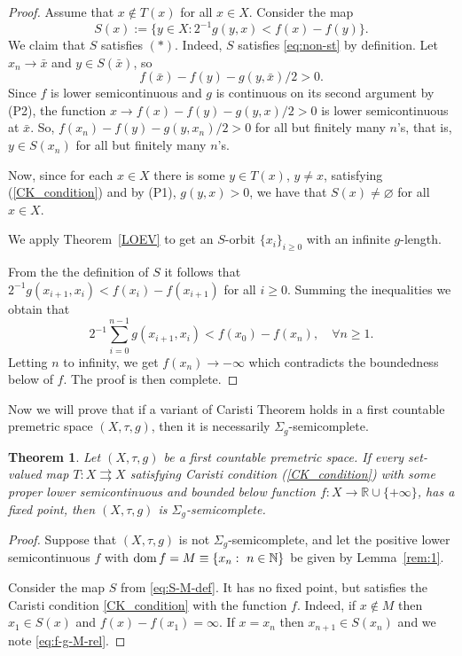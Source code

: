 \documentclass[12pt]{article}
\newtheorem{theorem}{Theorem}[section]
\def\dom{\mathop{\rm dom}}
\newcommand{\R}{\mathbb{R}}
\begin{document}
\begin{proof}
Assume that $x \notin T(x)$ for all $x \in X$. Consider the map
\[S(x):=\{y \in X: 2^{-1}g(y,x) < f(x)-f(y) \}.\]
We claim that $S$ satisfies $(\ast)$. Indeed, $S$ satisfies \eqref{eq:non-st} by definition. Let $x_n\to \bar x$ and $y\in S(\bar x)$, so
$$
   f(\bar x) - f(y) - g(y,\bar x)/2 > 0.
$$
Since $f$ is lower semicontinuous and $g$ is continuous on its second argument by (P2), the function $x\to f(x) - f(y) - g(y,x)/2 >0$ is lower semicontinuous at $\bar x$. So,  $f(x_n) - f(y) - g(y,x_n)/2 >0$ for all but finitely many $n$'s, that is, $y\in S(x_n)$ for all but finitely many $n$'s.

Now, since for each $x \in X$ there is some $y \in T(x)$, $y\neq x$, satisfying (\ref{CK_condition}) and by (P1), $g(y,x)>0$, we have that  $S(x) \neq \varnothing$ for all $x \in X$.

We apply  Theorem~\ref{LOEV} to get an $S$-orbit $\{x_i\}_{i\ge 0}$ with an
infinite $g$-length.

From the  the definition of $S$ it follows that  $2^{-1}g(x_{i+1},x_{i})<f(x_i)-f(x_{i+1})$ for all $i\ge 0$. Summing the inequalities we obtain that
\[ 2^{-1} \sum_{i=0}^{n-1} g(x_{i+1},x_{i})<f(x_0)-f(x_{n}), \quad \forall n\ge 1.\]
 Letting  $n$ to infinity, we get $f(x_n) \rightarrow -\infty$ which contradicts the boundedness below of  $f$. The proof is then complete.
\end{proof}

Now we will prove that if a variant of Caristi Theorem  holds  in a first countable premetric space $(X,\tau,g)$, then it is  necessarily $\Sigma_g$-semicomplete.

\begin{theorem} \label{Caristi inverse}
Let $(X,\tau,g)$ be a first countable premetric space. If every set-valued map $T: X \rightrightarrows X$ satisfying Caristi condition (\ref{CK_condition}) with some proper lower semicontinuous and bounded below function $f:X\to \R\cup\{+\infty\}$, has a fixed point, then $(X,\tau,g)$ is  $\Sigma_g$-semicomplete.
\end{theorem}
\begin{proof}
Suppose that $(X,\tau,g)$ is not  $\Sigma_g$-semicomplete, and let the positive lower semicontinuous $f$ with $\dom f = M\equiv \{x_n:\ n\in\mathbb{N}\}$ be given by Lemma~\ref{rem:1}.

Consider the map  $S$ from \eqref{eq:S-M-def}. It has no fixed point, but satisfies the Caristi condition \eqref{CK_condition} with  the function $f$. Indeed, if $x\notin M$ then $x_1\in S(x)$ and $f(x)-f(x_1)=\infty$. If $x=x_n$ then $x_{n+1}\in S(x_n)$ and we note \eqref{eq:f-g-M-rel}.
\end{proof}
\end{document}
